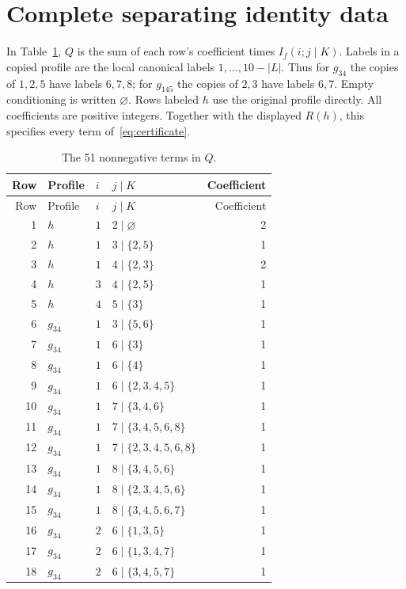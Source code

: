 \documentclass[11pt]{article}
\begin{document}
\section{Complete separating identity data}\label{app:negative}
In Table~\ref{tab:negative}, $Q$ is the sum of each row's coefficient times
$I_f(i;j\mid K)$. Labels in a copied profile are the local canonical labels
$1,\ldots,10-|L|$. Thus for $g_{34}$ the copies of $1,2,5$ have labels $6,7,8$;
for $g_{145}$ the copies of $2,3$ have labels $6,7$. Empty conditioning is
written $\varnothing$. Rows labeled $h$ use the original profile directly.
All coefficients are positive integers. Together with the displayed $R(h)$,
this specifies every term of~\eqref{eq:certificate}.
\begin{longtable}{rlllr}
\caption{The 51 nonnegative terms in $Q$.}\label{tab:negative}\\
\toprule Row & Profile & $i$ & $j\mid K$ & Coefficient\\\midrule\endfirsthead
\toprule Row & Profile & $i$ & $j\mid K$ & Coefficient\\\midrule\endhead
1 & $h$ & $1$ & $2\mid \varnothing$ & 2 \\
2 & $h$ & $1$ & $3\mid \{2,5\}$ & 1 \\
3 & $h$ & $1$ & $4\mid \{2,3\}$ & 2 \\
4 & $h$ & $3$ & $4\mid \{2,5\}$ & 1 \\
5 & $h$ & $4$ & $5\mid \{3\}$ & 1 \\
6 & $g_{34}$ & $1$ & $3\mid \{5,6\}$ & 1 \\
7 & $g_{34}$ & $1$ & $6\mid \{3\}$ & 1 \\
8 & $g_{34}$ & $1$ & $6\mid \{4\}$ & 1 \\
9 & $g_{34}$ & $1$ & $6\mid \{2,3,4,5\}$ & 1 \\
10 & $g_{34}$ & $1$ & $7\mid \{3,4,6\}$ & 1 \\
11 & $g_{34}$ & $1$ & $7\mid \{3,4,5,6,8\}$ & 1 \\
12 & $g_{34}$ & $1$ & $7\mid \{2,3,4,5,6,8\}$ & 1 \\
13 & $g_{34}$ & $1$ & $8\mid \{3,4,5,6\}$ & 1 \\
14 & $g_{34}$ & $1$ & $8\mid \{2,3,4,5,6\}$ & 1 \\
15 & $g_{34}$ & $1$ & $8\mid \{3,4,5,6,7\}$ & 1 \\
16 & $g_{34}$ & $2$ & $6\mid \{1,3,5\}$ & 1 \\
17 & $g_{34}$ & $2$ & $6\mid \{1,3,4,7\}$ & 1 \\
18 & $g_{34}$ & $2$ & $6\mid \{3,4,5,7\}$ & 1 \\

\end{longtable}
\end{document}
